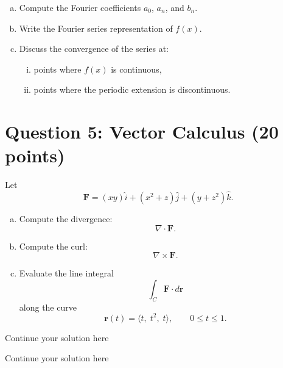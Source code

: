 \documentclass{article}
\begin{document}
\begin{enumerate}[a)]
\item Compute the Fourier coefficients \(a_0\), \(a_n\), and \(b_n\).

\item Write the Fourier series representation of \(f(x)\).

\item Discuss the convergence of the series at:
\begin{enumerate}[i)]
\item points where \(f(x)\) is continuous,
\item points where the periodic extension is discontinuous.
\end{enumerate}
\end{enumerate}

\newpage

\section*{Question 5: Vector Calculus (20 points)}

Let
\[
\mathbf{F}=(xy)\hat{i}+(x^2+z)\hat{j}+(y+z^2)\hat{k}.
\]

\begin{enumerate}[a)]
\item Compute the divergence:
\[
\nabla\cdot\mathbf{F}.
\]

\item Compute the curl:
\[
\nabla\times\mathbf{F}.
\]

\item Evaluate the line integral
\[
\int_C \mathbf{F}\cdot d\mathbf{r}
\]
along the curve
\[
\mathbf{r}(t)=\langle t,\; t^2,\; t\rangle,
\qquad 0\le t\le 1.
\]
\end{enumerate}

\newpage
Continue your solution here
\vspace{4.0in}

\newpage

\newpage
Continue your solution here
\vspace{4.0in}

\newpage
\end{document}
